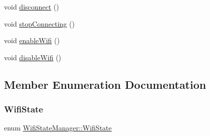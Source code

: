 \begin{DoxyCompactItemize}
\item 
void \mbox{\hyperlink{classWifiStateManager_aa9f478f7905b7103bf6596dcbe6717d3}{disconnect}} ()
\item 
void \mbox{\hyperlink{classWifiStateManager_a00336ecc19375303c0b82a2388d50694}{stop\+Connecting}} ()
\item 
void \mbox{\hyperlink{classWifiStateManager_a2528684b37998029537a4f6ff5d47d6f}{enable\+Wifi}} ()
\item 
void \mbox{\hyperlink{classWifiStateManager_a5c6b95e776d893ed4b8686de6577cc36}{disable\+Wifi}} ()
\end{DoxyCompactItemize}


\subsection{Member Enumeration Documentation}
\mbox{\label{classWifiStateManager_a1b2ed840606c57c43d4a147c96d43128}} 
\subsubsection{\texorpdfstring{Wifi\+State}{WifiState}}
{\footnotesize\ttfamily enum \mbox{\hyperlink{classWifiStateManager_a1b2ed840606c57c43d4a147c96d43128}{Wifi\+State\+Manager\+::\+Wifi\+State}}}

